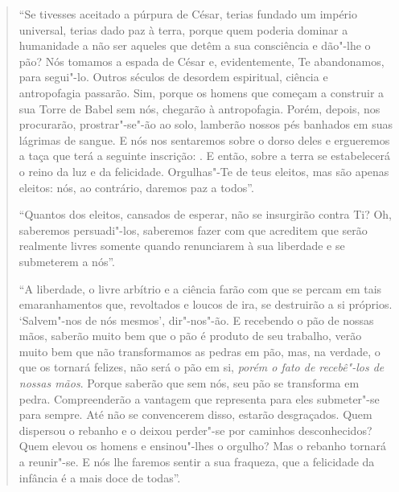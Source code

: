 \begin{quote}
``Se tivesses aceitado a púrpura de César, terias fundado um império
universal, terias dado paz à terra, porque quem poderia dominar a
humanidade a não ser aqueles que detêm a sua consciência e dão"-lhe o
pão? Nós tomamos a espada de César e, evidentemente, Te abandonamos,
para segui"-lo. Outros séculos de desordem espiritual, ciência e
antropofagia passarão. Sim, porque os homens que começam a construir a
sua Torre de Babel sem nós, chegarão à antropofagia. Porém, depois, nos
procurarão, prostrar"-se"-ão ao solo, lamberão nossos pés banhados em suas
lágrimas de sangue. E nós nos sentaremos sobre o dorso deles e
ergueremos a taça que terá a seguinte inscrição: . E então,
sobre a terra se estabelecerá o reino da luz e da felicidade.
Orgulhas"-Te de teus eleitos, mas são apenas eleitos: nós, ao contrário,
daremos paz a todos''.

``Quantos dos eleitos, cansados de esperar, não se insurgirão contra Ti?
Oh, saberemos persuadi"-los, saberemos fazer com que acreditem que serão
realmente livres somente quando renunciarem à sua liberdade e se
submeterem a nós''.

``A liberdade, o livre arbítrio e a ciência farão com que se percam em
tais emaranhamentos que, revoltados e loucos de ira, se destruirão a si
próprios. `Salvem"-nos de nós mesmos', dir"-nos"-ão. E recebendo o pão de
nossas mãos, saberão muito bem que o pão é produto de seu trabalho,
verão muito bem que não transformamos as pedras em pão, mas, na verdade,
o que os tornará felizes, não será o pão em si, \emph{porém o fato de
recebê"-los de nossas mãos}. Porque saberão que sem nós, seu pão se
transforma em pedra. Compreenderão a vantagem que representa para eles
submeter"-se para sempre. Até não se convencerem disso, estarão
desgraçados. Quem dispersou o rebanho e o deixou perder"-se por caminhos
desconhecidos? Quem elevou os homens e ensinou"-lhes o orgulho? Mas o
rebanho tornará a reunir"-se. E nós lhe faremos sentir a sua fraqueza,
que a felicidade da infância é a mais doce de todas''.


\end{quote}
